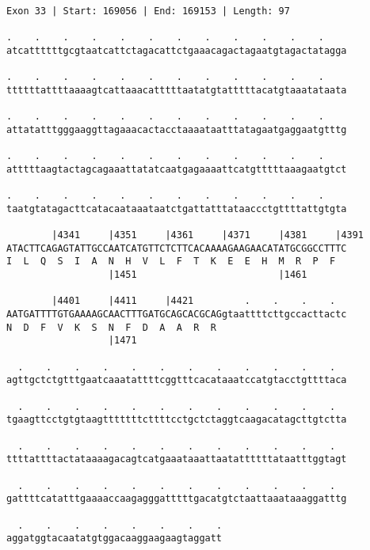 \documentclass{article}
\begin{document}
\newpage
\begin{Verbatim}
Exon 33 | Start: 169056 | End: 169153 | Length: 97
 
.    .    .    .    .    .    .    .    .    .    .    .    
atcattttttgcgtaatcattctagacattctgaaacagactagaatgtagactatagga
  
.    .    .    .    .    .    .    .    .    .    .    .    
ttttttattttaaaagtcattaaacatttttaatatgtatttttacatgtaaatataata
  
.    .    .    .    .    .    .    .    .    .    .    .    
attatatttgggaaggttagaaacactacctaaaataatttatagaatgaggaatgtttg
  
.    .    .    .    .    .    .    .    .    .    .    .    
atttttaagtactagcagaaattatatcaatgagaaaattcatgtttttaaagaatgtct
  
.    .    .    .    .    .    .    .    .    .    .    .    
taatgtatagacttcatacaataaataatctgattatttataaccctgttttattgtgta
  
        |4341     |4351     |4361     |4371     |4381     |4391
ATACTTCAGAGTATTGCCAATCATGTTCTCTTCACAAAAGAAGAACATATGCGGCCTTTC
I  L  Q  S  I  A  N  H  V  L  F  T  K  E  E  H  M  R  P  F  
                  |1451                         |1461       
  
        |4401     |4411     |4421         .    .    .    .  
AATGATTTTGTGAAAAGCAACTTTGATGCAGCACGCAGgtaattttcttgccacttactc
N  D  F  V  K  S  N  F  D  A  A  R  R                       
                  |1471                                     
  
  .    .    .    .    .    .    .    .    .    .    .    .  
agttgctctgtttgaatcaaatattttcggtttcacataaatccatgtacctgttttaca
  
  .    .    .    .    .    .    .    .    .    .    .    .  
tgaagttcctgtgtaagtttttttcttttcctgctctaggtcaagacatagcttgtctta
  
  .    .    .    .    .    .    .    .    .    .    .    .  
ttttattttactataaaagacagtcatgaaataaattaatattttttataatttggtagt
  
  .    .    .    .    .    .    .    .    .    .    .    .  
gattttcatatttgaaaaccaagagggatttttgacatgtctaattaaataaaggatttg
  
  .    .    .    .    .    .    .    .
aggatggtacaatatgtggacaaggaagaagtaggatt
\end{Verbatim}
\newpage
\end{document}
